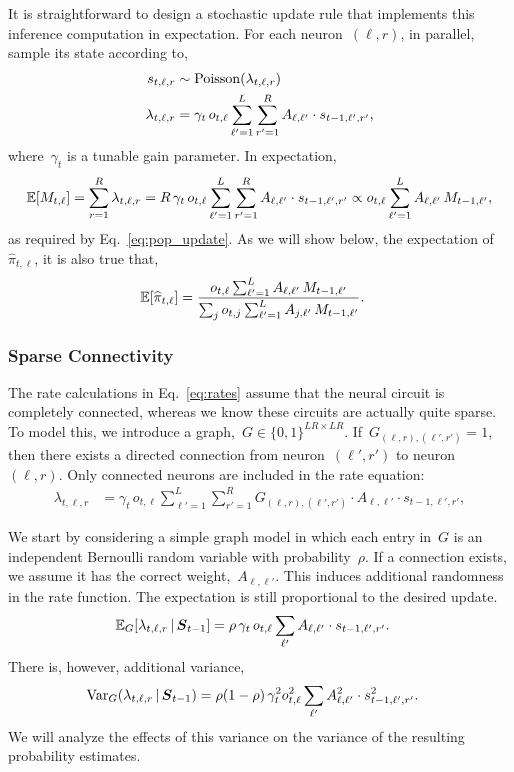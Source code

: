 It is straightforward to design a stochastic update rule that 
implements this inference computation in expectation. 
For each neuron~$(\ell,r)$, in parallel, sample its state according to,
\begin{align}
  s_{t,\ell,r} &\sim \mathrm{Poisson} (\lambda_{t, \ell, r}) \\
  \label{eq:rates}
    \lambda_{t, \ell, r} &= 
    \gamma_t \, o_{t,\ell} \sum_{\ell'=1}^L \sum_{r'=1}^R A_{\ell, \ell'} \cdot s_{t-1,\ell',r'},
\end{align}
where~$\gamma_t$ is a tunable gain parameter. In expectation,
\begin{align}
  \mathbb{E}[M_{t, \ell}] = \sum_{r=1}^R \lambda_{t, \ell, r}
  = R \, \gamma_t \, o_{t,\ell} \sum_{\ell'=1}^L \sum_{r'=1}^R A_{\ell, \ell'} \cdot s_{t-1,\ell',r'}
  \propto o_{t,\ell} \sum_{\ell'=1}^L A_{\ell, \ell'} \, M_{t-1, \ell'},
\end{align}
as required by Eq.~\ref{eq:pop_update}. As we will show below, the
expectation of~$\widehat{\pi}_{t,\ell}$, it is also true that,
\begin{align}
  \mathbb{E}[\widehat{\pi}_{t,\ell}] &= \frac{o_{t,\ell} \sum_{\ell'=1}^L A_{\ell, \ell'} \, M_{t-1, \ell'}}{\sum_{j} o_{t,j} \sum_{\ell'=1}^L A_{j, \ell'} \, M_{t-1, \ell'}}.
\end{align}

\subsubsection{Sparse Connectivity}
The rate calculations in Eq.~\ref{eq:rates} assume that the neural circuit
is completely connected, whereas we know these circuits are actually quite sparse.
To model this, we introduce a graph,~${G \in \{0,1\}^{LR \times LR}}$.
If~$G_{(\ell,r),(\ell',r')}=1$, then there exists a directed connection from
neuron~$(\ell',r')$ to neuron~$(\ell, r)$. Only connected neurons are
included in the rate equation:
\begin{align}
    \lambda_{t, \ell, r} &= 
    \gamma_t \, o_{t,\ell} \sum_{\ell'=1}^L \sum_{r'=1}^R
    G_{(\ell,r),(\ell',r')} \cdot A_{\ell, \ell'} \cdot s_{t-1,\ell',r'},
\end{align}

We start by considering a simple graph model in which each entry in~$G$
is an independent Bernoulli random variable with probability~$\rho$.
If a connection exists,
we assume it has the correct weight,~$A_{\ell, \ell'}$.
This induces additional randomness
in the rate function. The expectation is
still proportional to the desired update.
\begin{align}
  \mathbb{E}_G[\lambda_{t, \ell, r} \,|\, \boldsymbol{S}_{t-1}]
  &= \rho \, \gamma_t \, o_{t, \ell}
  \sum_{\ell'} A_{\ell, \ell'} \cdot s_{t-1, \ell', r'}.
\end{align}
There is, however, additional variance,
\begin{align}
  \mathrm{Var}_G(\lambda_{t, \ell, r} \,|\, \boldsymbol{S}_{t-1})
  &= \rho(1-\rho) \, \gamma_t^2 o_{t,\ell}^2
  \sum_{\ell'} A_{\ell, \ell'}^2 \cdot s_{t-1, \ell', r'}^2 .
\end{align}
We will analyze the effects of this variance on the variance
of the resulting probability estimates. 

